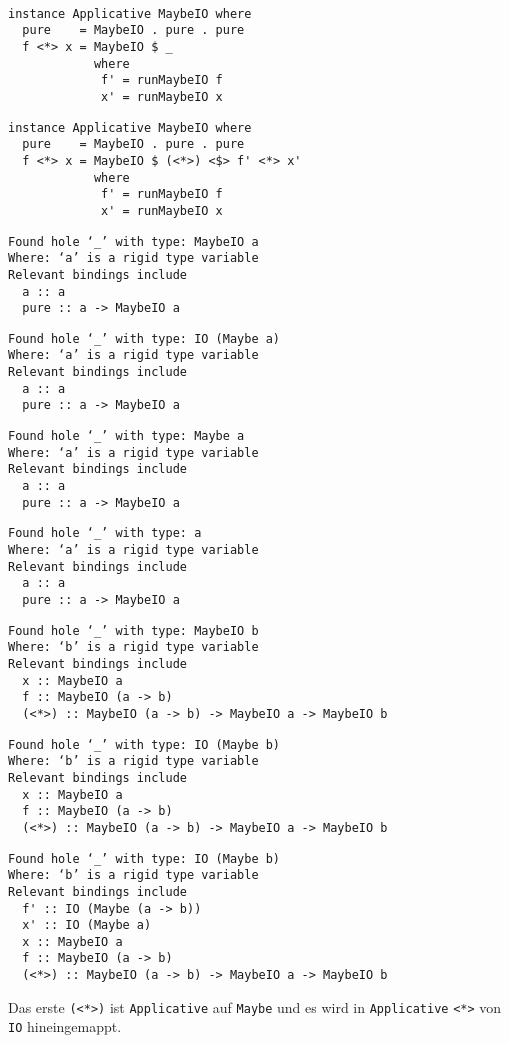 \documentclass{beamer}
\begin{document}
\begin{frame}[fragile]
\begin{overprint}
\begin{verbatim}
                 
\end{verbatim}
\begin{verbatim}
instance Applicative MaybeIO where
  pure    = MaybeIO . pure . pure
  f <*> x = MaybeIO $ _
            where
             f' = runMaybeIO f
             x' = runMaybeIO x
\end{verbatim}
\begin{verbatim}
instance Applicative MaybeIO where
  pure    = MaybeIO . pure . pure
  f <*> x = MaybeIO $ (<*>) <$> f' <*> x'
            where
             f' = runMaybeIO f
             x' = runMaybeIO x
\end{verbatim}
\end{overprint}
\bigskip
\scriptsize
\begin{overprint}
\begin{verbatim}
Found hole ‘_’ with type: MaybeIO a
Where: ‘a’ is a rigid type variable
Relevant bindings include
  a :: a
  pure :: a -> MaybeIO a
\end{verbatim}
\begin{verbatim}
Found hole ‘_’ with type: IO (Maybe a)
Where: ‘a’ is a rigid type variable
Relevant bindings include
  a :: a
  pure :: a -> MaybeIO a
\end{verbatim}
\begin{verbatim}
Found hole ‘_’ with type: Maybe a
Where: ‘a’ is a rigid type variable
Relevant bindings include
  a :: a
  pure :: a -> MaybeIO a
\end{verbatim}
\begin{verbatim}
Found hole ‘_’ with type: a
Where: ‘a’ is a rigid type variable
Relevant bindings include
  a :: a
  pure :: a -> MaybeIO a
\end{verbatim}
\begin{verbatim}
Found hole ‘_’ with type: MaybeIO b
Where: ‘b’ is a rigid type variable
Relevant bindings include
  x :: MaybeIO a
  f :: MaybeIO (a -> b)
  (<*>) :: MaybeIO (a -> b) -> MaybeIO a -> MaybeIO b
\end{verbatim}
\begin{verbatim}
Found hole ‘_’ with type: IO (Maybe b)
Where: ‘b’ is a rigid type variable
Relevant bindings include
  x :: MaybeIO a
  f :: MaybeIO (a -> b)
  (<*>) :: MaybeIO (a -> b) -> MaybeIO a -> MaybeIO b
\end{verbatim}
\begin{verbatim}
Found hole ‘_’ with type: IO (Maybe b)
Where: ‘b’ is a rigid type variable
Relevant bindings include
  f' :: IO (Maybe (a -> b))
  x' :: IO (Maybe a)
  x :: MaybeIO a
  f :: MaybeIO (a -> b)
  (<*>) :: MaybeIO (a -> b) -> MaybeIO a -> MaybeIO b
\end{verbatim}
\normalsize
Das erste \texttt{(<*>)} ist \texttt{Applicative} auf \texttt{Maybe} und es wird in \texttt{Applicative} \texttt{<*>} von \texttt{IO} hineingemappt.
\end{overprint}
\end{frame}
\end{document}
